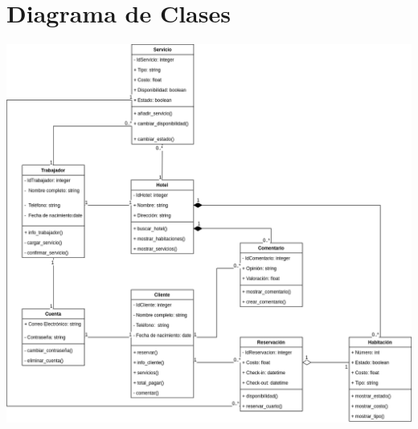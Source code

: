 \section{\bfseries\LARGE Diagrama de Clases}
\begin{center}
    \includegraphics[scale=0.45]{img/clases.png}  
\end{center}